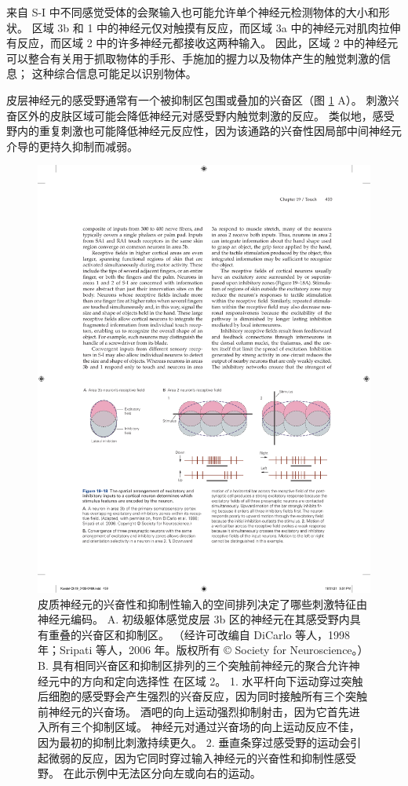 来自 S-I 中不同感觉受体的会聚输入也可能允许单个神经元检测物体的大小和形状。 
区域 3b 和 1 中的神经元仅对触摸有反应，而区域 3a 中的神经元对肌肉拉伸有反应，而区域 2 中的许多神经元都接收这两种输入。 
因此，区域 2 中的神经元可以整合有关用于抓取物体的手形、手施加的握力以及物体产生的触觉刺激的信息； 这种综合信息可能足以识别物体。


皮层神经元的感受野通常有一个被抑制区包围或叠加的兴奋区（图 \ref{fig:19_18} A）。 刺激兴奋区外的皮肤区域可能会降低神经元对感受野内触觉刺激的反应。 
类似地，感受野内的重复刺激也可能降低神经元反应性，因为该通路的兴奋性因局部中间神经元介导的更持久抑制而减弱。

\begin{figure}[htbp]
	\centering
	\includegraphics[width=1.0\linewidth]{chap19/fig_19_18}
	\caption{皮质神经元的兴奋性和抑制性输入的空间排列决定了哪些刺激特征由神经元编码。 
		A. 初级躯体感觉皮层 3b 区的神经元在其感受野内具有重叠的兴奋区和抑制区。 （经许可改编自 DiCarlo 等人，1998 年；Sripati 等人，2006 年。版权所有 © Society for Neuroscience。）
		B. 具有相同兴奋区和抑制区排列的三个突触前神经元的聚合允许神经元中的方向和定向选择性 在区域 2。 
		1. 水平杆向下运动穿过突触后细胞的感受野会产生强烈的兴奋反应，因为同时接触所有三个突触前神经元的兴奋场。 
		酒吧的向上运动强烈抑制射击，因为它首先进入所有三个抑制区域。 
		神经元对通过兴奋场的向上运动反应不佳，因为最初的抑制比刺激持续更久。 
		2. 垂直条穿过感受野的运动会引起微弱的反应，因为它同时穿过输入神经元的兴奋性和抑制性感受野。 
		在此示例中无法区分向左或向右的运动。}
	\label{fig:19_18}
\end{figure}

